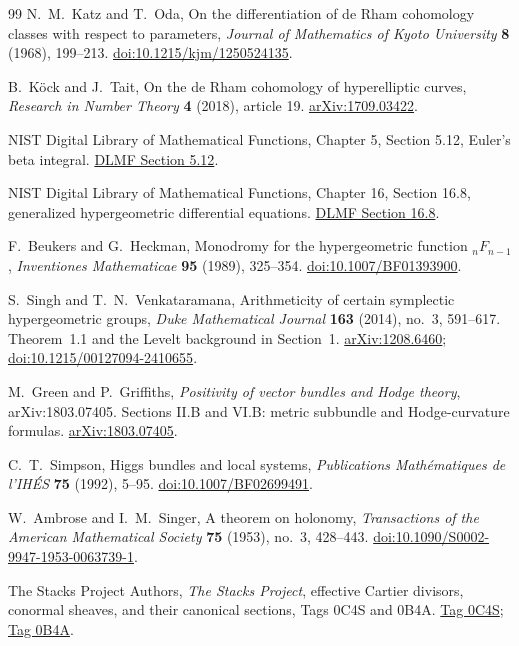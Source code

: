\documentclass[11pt]{article}
\theoremstyle{definition}
\theoremstyle{remark}
\begin{document}
\begin{thebibliography}{99}
N.~M.~Katz and T.~Oda,
On the differentiation of de Rham cohomology classes with respect to parameters,
\emph{Journal of Mathematics of Kyoto University} \textbf{8} (1968), 199--213.
\href{https://doi.org/10.1215/kjm/1250524135}{doi:10.1215/kjm/1250524135}.

B.~K\"ock and J.~Tait,
On the de Rham cohomology of hyperelliptic curves,
\emph{Research in Number Theory} \textbf{4} (2018), article 19.
\href{https://arxiv.org/abs/1709.03422}{arXiv:1709.03422}.


NIST Digital Library of Mathematical Functions,
Chapter 5, Section 5.12, Euler's beta integral.
\href{https://dlmf.nist.gov/5.12}{DLMF Section 5.12}.

NIST Digital Library of Mathematical Functions,
Chapter 16, Section 16.8, generalized hypergeometric differential equations.
\href{https://dlmf.nist.gov/16.8}{DLMF Section 16.8}.

F.~Beukers and G.~Heckman,
Monodromy for the hypergeometric function ${}_nF_{n-1}$,
\emph{Inventiones Mathematicae} \textbf{95} (1989), 325--354.
\href{https://doi.org/10.1007/BF01393900}{doi:10.1007/BF01393900}.

S.~Singh and T.~N.~Venkataramana,
Arithmeticity of certain symplectic hypergeometric groups,
\emph{Duke Mathematical Journal} \textbf{163} (2014), no.~3, 591--617.
Theorem~1.1 and the Levelt background in Section~1.
\href{https://arxiv.org/abs/1208.6460}{arXiv:1208.6460};
\href{https://doi.org/10.1215/00127094-2410655}{doi:10.1215/00127094-2410655}.


M.~Green and P.~Griffiths,
\emph{Positivity of vector bundles and Hodge theory}, arXiv:1803.07405.
Sections II.B and VI.B: metric subbundle and Hodge-curvature formulas.
\href{https://arxiv.org/abs/1803.07405}{arXiv:1803.07405}.

C.~T.~Simpson,
Higgs bundles and local systems,
\emph{Publications Math\'ematiques de l'IH\'ES} \textbf{75} (1992), 5--95.
\href{https://doi.org/10.1007/BF02699491}{doi:10.1007/BF02699491}.

W.~Ambrose and I.~M.~Singer,
A theorem on holonomy,
\emph{Transactions of the American Mathematical Society} \textbf{75}
(1953), no.~3, 428--443.
\href{https://doi.org/10.1090/S0002-9947-1953-0063739-1}{doi:10.1090/S0002-9947-1953-0063739-1}.


The Stacks Project Authors,
\emph{The Stacks Project}, effective Cartier divisors, conormal sheaves,
and their canonical sections, Tags 0C4S and 0B4A.
\href{https://stacks.math.columbia.edu/tag/0C4S}{Tag 0C4S};
\href{https://stacks.math.columbia.edu/tag/0B4A}{Tag 0B4A}.


\end{thebibliography}
\end{document}
